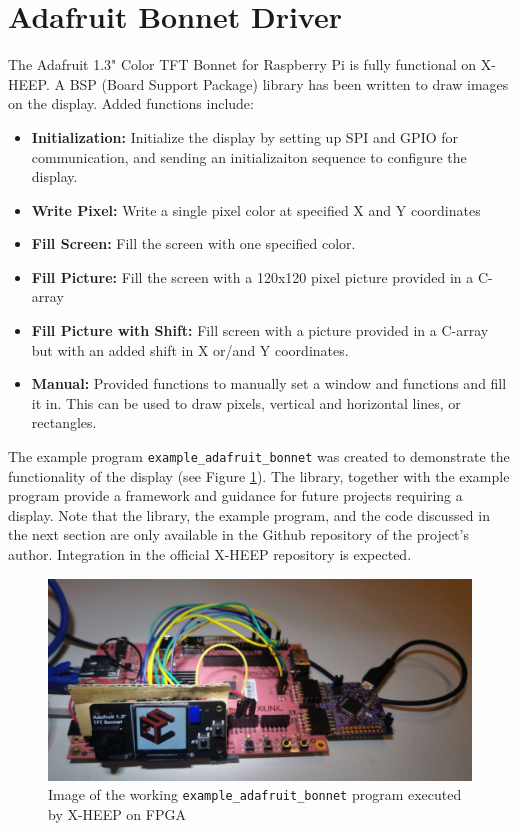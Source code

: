 \label{chapter:presentProjectState}

\section{Adafruit Bonnet Driver}

The Adafruit 1.3" Color TFT Bonnet for Raspberry Pi \cite{adafruitwebsite} is fully functional on X-HEEP. A BSP (Board Support Package) library has been written to draw images on the display. Added functions include: \\

\begin{itemize}
   \item \textbf{Initialization:} Initialize the display by setting up SPI and GPIO for communication, and sending an initializaiton sequence to configure the display.
   \item \textbf{Write Pixel:} Write a single pixel color at specified X and Y coordinates
   \item \textbf{Fill Screen:} Fill the screen with one specified color.
   \item \textbf{Fill Picture:} Fill the screen with a 120x120 pixel picture provided in a C-array
   \item \textbf{Fill Picture with Shift:} Fill screen with a picture provided in a C-array but with an added shift in X or/and Y coordinates.
   \item \textbf{Manual:} Provided functions to manually set a window and functions and fill it in. This can be used to draw pixels, vertical and horizontal lines, or rectangles.
\end{itemize}

The example program \texttt{example\_adafruit\_bonnet} was created to demonstrate the functionality of the display (see Figure \ref{fig:exampleAdafruitBonnet}). The library, together with the example program provide a framework and guidance for future projects requiring a display. Note that the library, the example program, and the code discussed in the next section are only available in the Github repository \cite{projectRepo} of the project's author. Integration in the official X-HEEP repository \cite{xHeepRepo} is expected.

\begin{figure}[ht]
    \centering
    \includegraphics[width=\textwidth]{images/FPGA_ESL_LOGO.jpg}
    \caption{Image of the working \texttt{example\_adafruit\_bonnet} program executed by X-HEEP on FPGA}
    \label{fig:exampleAdafruitBonnet}
\end{figure}


